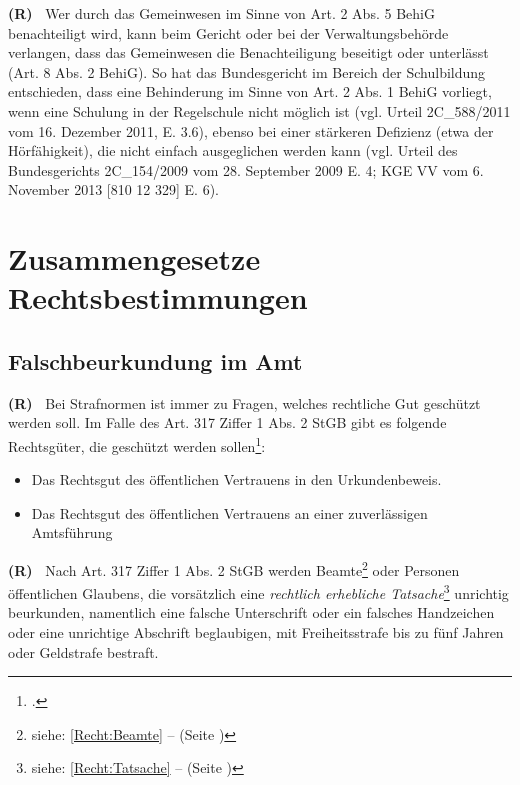 \documentclass[paper=a4,fontsize=12pt, oneside, numbers=noenddot]{scrbook}
\newcounter{rz}
\newcommand{\Rz}{
	\addtocounter{rz}{1}\textbf{(R\arabic{rz})~}
}
\begin{document}
\Rz Wer durch das Gemeinwesen im Sinne von Art. 2 Abs. 5 BehiG benachteiligt wird, kann beim Gericht oder bei der Verwaltungsbehörde verlangen, dass das Gemeinwesen die Benachteiligung beseitigt oder unterlässt (Art. 8 Abs. 2 BehiG). So hat das Bundesgericht im Bereich der Schulbildung entschieden, dass eine Behinderung im Sinne von Art. 2 Abs. 1 BehiG vorliegt, wenn eine Schulung in der Regelschule nicht möglich ist (vgl. Urteil 2C\_588/2011 vom 16. Dezember 2011, E. 3.6), ebenso bei einer stärkeren Defizienz (etwa der Hörfähigkeit), die nicht einfach ausgeglichen werden kann (vgl. Urteil des Bundesgerichts 2C\_154/2009 vom 28. September 2009 E. 4; KGE VV vom 6. November 2013 [810 12 329] E. 6).



\section{Zusammengesetze Rechtsbestimmungen}

\subsection{Falschbeurkundung im Amt}
\Rz Bei Strafnormen ist immer zu Fragen, welches rechtliche Gut geschützt werden soll. Im Falle des Art. 317 Ziffer 1 Abs. 2 StGB gibt es folgende Rechtsgüter, die geschützt werden sollen\footcite[Art. 317, Rz. 1]{2020:Wohlers:StGBHandkommentar}:

\begin{itemize}[noitemsep]\setlength\itemsep{0.3em}
\item Das Rechtsgut des öffentlichen Vertrauens in den Urkundenbeweis.
\item Das Rechtsgut des öffentlichen Vertrauens an einer zuverlässigen Amtsführung
\end{itemize} 

\Rz Nach Art. 317 Ziffer 1 Abs. 2 StGB werden Beamte\footnote{siehe: \ref{Recht:Beamte} --  (Seite \pageref{Recht:Beamte})} oder Personen öffentlichen Glaubens, die vorsätzlich eine \textit{rechtlich erhebliche Tatsache}\footnote{siehe: \ref{Recht:Tatsache} --  (Seite \pageref{Recht:Tatsache})} unrichtig beurkunden, namentlich eine falsche Unterschrift oder ein falsches Handzeichen oder eine unrichtige Abschrift beglaubigen, mit Freiheitsstrafe bis zu fünf Jahren oder Geldstrafe bestraft.
\end{document}
